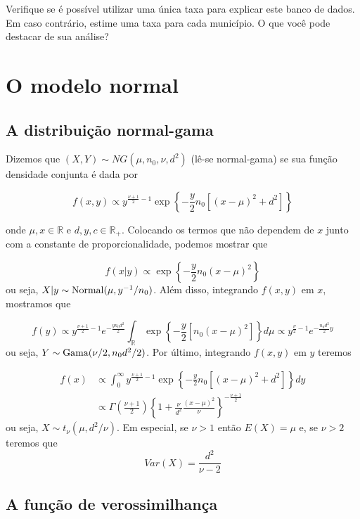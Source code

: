 \documentclass[
  letterpaper,
  DIV=11,
  numbers=noendperiod]{scrreprt}
\theoremstyle{definition}
\theoremstyle{plain}
\theoremstyle{definition}
\theoremstyle{remark}
\begin{document}
Verifique se é possível utilizar uma única taxa para explicar este banco
de dados. Em caso contrário, estime uma taxa para cada município. O que
você pode destacar de sua análise?


\chapter{O modelo normal}\label{o-modelo-normal}

\section{A distribuição
normal-gama}\label{a-distribuiuxe7uxe3o-normal-gama}

Dizemos que \((X,Y)\sim NG(\mu,n_0,\nu,d^2)\) (lê-se normal-gama) se sua
função densidade conjunta é dada por

\[f(x,y)\propto y^{\frac{\nu+1}{2}-1}\exp\left\{-\frac{y}{2}n_0\left[(x-\mu)^2 + d^2\right]\right\}\]

onde \(\mu,x\in\mathbb{R}\) e \(d,y,c\in\mathbb{R}_+\). Colocando os
termos que não dependem de \(x\) junto com a constante de
proporcionalidade, podemos mostrar que

\[f(x|y)\propto \exp\left\{-\frac{y}{2}n_0(x-\mu)^2\right\}\] ou seja,
\(X|y\sim\hbox{Normal}(\mu,y^{-1}/n_0)\). Além disso, integrando
\(f(x,y)\) em \(x\), mostramos que

\[f(y)\propto y^{\frac{\nu+1}{2}-1}e^{-\frac{yn_0d^2}{2}}\int_{\mathbb{R}}\exp\left\{-\frac{y}{2}\left[n_0(x-\mu)^2\right]\right\}d\mu\propto y^{\frac{\nu}{2}-1}e^{-\frac{n_0d^2}{2}y}\]
ou seja, \(Y\sim\hbox{Gama}(\nu/2, n_0d^2/2)\). Por último, integrando
\(f(x,y)\) em \(y\) teremos

\[\begin{align}f(x)&\propto \int_0^\infty y^{\frac{\nu+1}{2}-1}\exp\left\{-\frac{y}{2}n_0\left[(x-\mu)^2 + d^2\right]\right\}dy \\&\propto \Gamma\left(\frac{\nu+1}{2}\right)\left\{1+\frac{\nu}{d^2}\frac{(x-\mu)^2}{\nu}\right\}^{-\frac{\nu+1}{2}}\end{align}\]
ou seja, \(X\sim t_{\nu}(\mu, d^2/\nu)\). Em especial, se \(\nu>1\)
então \(E(X)=\mu\) e, se \(\nu>2\) teremos que
\[Var(X)=\frac{d^2}{\nu-2}\]

\section{A função de
verossimilhança}\label{a-funuxe7uxe3o-de-verossimilhanuxe7a-1}
\end{document}
